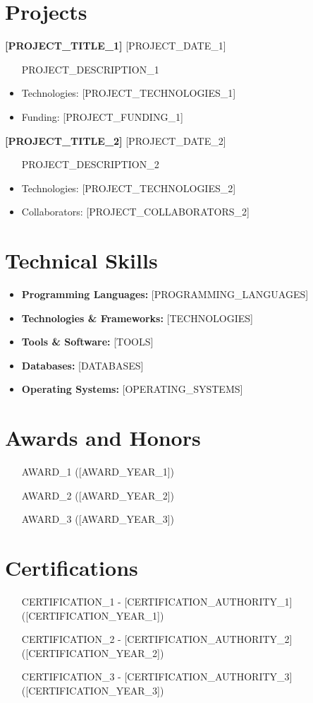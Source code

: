 \documentclass[11pt,a4paper]{article}
\newcommand{\cvsubentry}[2]{
    \textbf{#1} \hfill #2 \\
    \vspace{0.1cm}
}
\begin{document}
\section{Projects}
\cvsubentry{[PROJECT_TITLE_1]}{[PROJECT_DATE_1]}
\begin{itemize}[leftmargin=0.2in]
    \item [PROJECT_DESCRIPTION_1]
    \item Technologies: [PROJECT_TECHNOLOGIES_1]
    \item Funding: [PROJECT_FUNDING_1]
\end{itemize}

\cvsubentry{[PROJECT_TITLE_2]}{[PROJECT_DATE_2]}
\begin{itemize}[leftmargin=0.2in]
    \item [PROJECT_DESCRIPTION_2]
    \item Technologies: [PROJECT_TECHNOLOGIES_2]
    \item Collaborators: [PROJECT_COLLABORATORS_2]
\end{itemize}

\section{Technical Skills}
\begin{itemize}[leftmargin=0.2in]
    \item \textbf{Programming Languages:} [PROGRAMMING_LANGUAGES]
    \item \textbf{Technologies \& Frameworks:} [TECHNOLOGIES]
    \item \textbf{Tools \& Software:} [TOOLS]
    \item \textbf{Databases:} [DATABASES]
    \item \textbf{Operating Systems:} [OPERATING_SYSTEMS]
\end{itemize}

\section{Awards and Honors}
\begin{itemize}[leftmargin=0.2in]
    \item [AWARD_1] ([AWARD_YEAR_1])
    \item [AWARD_2] ([AWARD_YEAR_2])
    \item [AWARD_3] ([AWARD_YEAR_3])
\end{itemize}

\section{Certifications}
\begin{itemize}[leftmargin=0.2in]
    \item [CERTIFICATION_1] - [CERTIFICATION_AUTHORITY_1] ([CERTIFICATION_YEAR_1])
    \item [CERTIFICATION_2] - [CERTIFICATION_AUTHORITY_2] ([CERTIFICATION_YEAR_2])
    \item [CERTIFICATION_3] - [CERTIFICATION_AUTHORITY_3] ([CERTIFICATION_YEAR_3])
\end{itemize}
\end{document}

